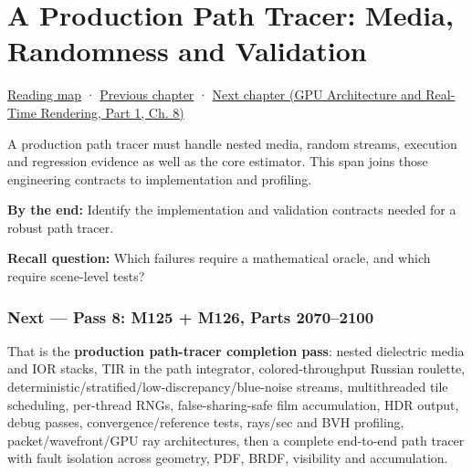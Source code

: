 \chapter{A Production Path Tracer: Media, Randomness and Validation}\label{03-visual-computing-i-ch010-a-production-path-tracer-media-randomness-and-validation}\hypertarget{03-visual-computing-i-ch010}{}\label{stagechapter:03-visual-computing-i-ch010}

\hypertarget{03-visual-computing-i-ch010-a-production-path-tracer-media-randomness-and-validation}{}

\hyperref[volume-reading-map]{Reading map} · \hyperref[03-visual-computing-i-ch009-point-lights-mis-and-environment-lighting]{Previous chapter} · \href{../06-GPU-Architecture-and-Real-Time-Rendering-P01/main.pdf\#nameddest=03-visual-computing-i-ch011-bvh-traversal-and-deterministic-evidence}{Next chapter (GPU Architecture and Real-Time Rendering, Part 1, Ch. 8)}

A production path tracer must handle nested media, random streams, execution and regression evidence as well as the core estimator. This span joins those engineering contracts to implementation and profiling.

\textbf{By the end:} Identify the implementation and validation contracts needed for a robust path tracer.

\textbf{Recall question:} Which failures require a mathematical oracle, and which require scene-level tests?

\subsection{Next --- Pass 8: M125 + M126, Parts 2070--2100}\label{03-visual-computing-i-ch010-next-pass-8-m125-m126-parts-20702100}

\hypertarget{03-visual-computing-i-ch010-next-pass-8-m125-m126-parts-20702100}{}

That is the \textbf{production path-tracer completion pass}: nested dielectric media and IOR stacks, TIR in the path integrator, colored-throughput Russian roulette, deterministic/stratified/low-discrepancy/blue-noise streams, multithreaded tile scheduling, per-thread RNGs, false-sharing-safe film accumulation, HDR output, debug passes, convergence/reference tests, rays/sec and BVH profiling, packet/wavefront/GPU ray architectures, then a complete end-to-end path tracer with fault isolation across geometry, PDF, BRDF, visibility and accumulation.

